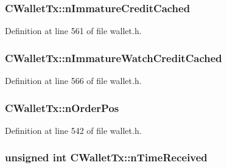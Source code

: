 \subsubsection[{n\+Immature\+Credit\+Cached}]{ C\+Wallet\+Tx\+::n\+Immature\+Credit\+Cached\hspace{0.3cm}{\ttfamily [mutable]}}\label{class_c_wallet_tx_a6b9278766d4c82554b8b4976bff3ef2c}


Definition at line 561 of file wallet.\+h.

\hypertarget{class_c_wallet_tx_afe7b93d5672df90c6b1d3065dc047fe0}{}
\subsubsection[{n\+Immature\+Watch\+Credit\+Cached}]{ C\+Wallet\+Tx\+::n\+Immature\+Watch\+Credit\+Cached\hspace{0.3cm}{\ttfamily [mutable]}}\label{class_c_wallet_tx_afe7b93d5672df90c6b1d3065dc047fe0}


Definition at line 566 of file wallet.\+h.

\hypertarget{class_c_wallet_tx_af51e160ff1d9d78986e9f239c7ac7a35}{}
\subsubsection[{n\+Order\+Pos}]{ C\+Wallet\+Tx\+::n\+Order\+Pos}\label{class_c_wallet_tx_af51e160ff1d9d78986e9f239c7ac7a35}


Definition at line 542 of file wallet.\+h.

\hypertarget{class_c_wallet_tx_af4f4b58875061467026da7b259532b69}{}
\subsubsection[{n\+Time\+Received}]{\setlength{\rightskip}{0pt plus 5cm}unsigned int C\+Wallet\+Tx\+::n\+Time\+Received}\label{class_c_wallet_tx_af4f4b58875061467026da7b259532b69}


